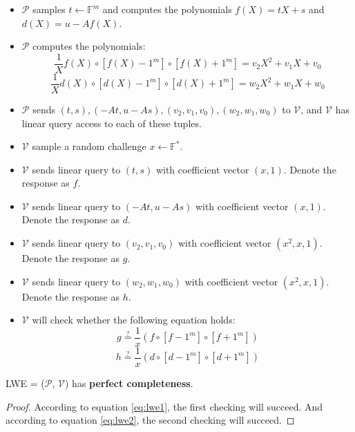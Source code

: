 \begin{itemize}
    \item $\mathcal{P}$ samples $t \leftarrow \mathbb{F}^{m}$ and computes the polynomials $f(X)=tX+s$ and $d(X)=u-Af(X)$.
    \item $\mathcal{P}$ computes the polynomials:
\begin{equation}
\label{eq:lwe1}
    \frac{1}{X} f(X) \circ [f(X) - 1^m] \circ [f(X) + 1^m] = v_2X^2 + v_1X + v_0
\end{equation}
\begin{equation}
\label{eq:lwe2}
    \frac{1}{X} d(X) \circ [d(X) - 1^m] \circ [d(X) + 1^m] = w_2X^2 + w_1X + w_0
\end{equation}

    \item $\mathcal{P}$ sends $(t, s), (-At, u-As), (v_2, v_1, v_0), (w_2, w_1, w_0)$ to $\mathcal{V}$, and $\mathcal{V}$ has linear query access to each of these tuples.
    
    \item $\mathcal{V}$ sample a random challenge $x \leftarrow \mathbb{F}^*$.
    
    \item $\mathcal{V}$ sends linear query to $(t, s)$ with coefficient vector $(x, 1)$. Denote the response as $f$.
    \item $\mathcal{V}$ sends linear query to $(-At, u-As)$ with coefficient vector $(x, 1)$. Denote the response as $d$.
    \item $\mathcal{V}$ sends linear query to $(v_2, v_1, v_0)$ with coefficient vector $(x^2, x, 1)$. Denote the response as $g$.
    \item $\mathcal{V}$ sends linear query to $(w_2, w_1, w_0)$ with coefficient vector $(x^2, x, 1)$. Denote the response as $h$.
    
    \item $\mathcal{V}$ will check whether the following equation holds:
$$
    g \overset{?}{=} \frac{1}{x} (f \circ [f - 1^m] \circ [f + 1^m])
$$
$$
    h \overset{?}{=} \frac{1}{x} (d \circ [d - 1^m] \circ [d + 1^m])
$$
\end{itemize}

\begin{lemma}
\label{lemma:lwepc}

LWE = ($\mathcal{P}$, $\mathcal{V}$) has \textbf{perfect completeness}.

\end{lemma}
\begin{proof}

According to equation \ref{eq:lwe1}, the first checking will succeed. And according to equation \ref{eq:lwe2}, the second checking will succeed.

\end{proof}

